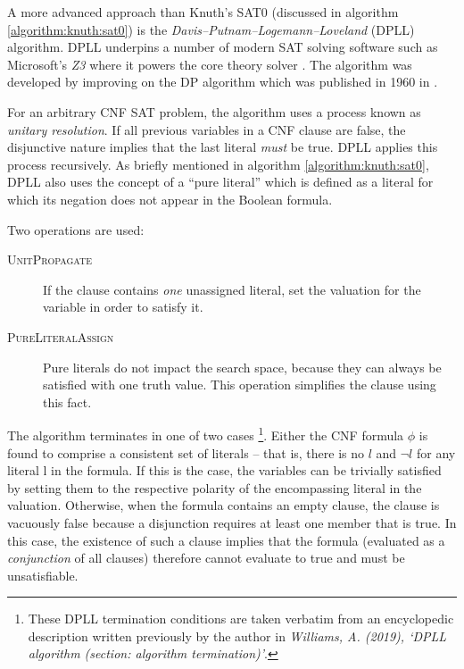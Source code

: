 \documentclass[a4paper,openany,12pt]{book}
\begin{document}
A more advanced approach than Knuth's SAT0 (discussed in algorithm \ref{algorithm:knuth:sat0}) is the \emph{Davis–Putnam–Logemann–Loveland} (DPLL) algorithm. DPLL underpins a number of modern SAT solving software such as Microsoft's \emph{Z3} where it powers the core theory solver \citep{de2008z3}. The algorithm was developed by improving on the DP algorithm which was published in 1960 in \citet{Davis:1960:CPQ:321033.321034}.

For an arbitrary CNF SAT problem, the algorithm uses a process known as \emph{unitary resolution}. If all previous variables in a CNF clause are false, the disjunctive nature implies that the last literal \emph{must} be true. DPLL applies this process recursively. As briefly mentioned in algorithm \ref{algorithm:knuth:sat0}, DPLL also uses the concept of a ``pure literal'' which is defined as a literal for which its negation does not appear in the Boolean formula.

Two operations are used:

\begin{description}
	\item[\textsc{UnitPropagate}] If the clause contains \emph{one} unassigned literal, set the valuation for the variable in order to satisfy it.
	\item[\textsc{PureLiteralAssign}] Pure literals do not impact the search space, because they can always be satisfied with one truth value. This operation simplifies the clause using this fact.
\end{description}

The algorithm terminates in one of two cases \footnote{These DPLL termination conditions are taken verbatim from an encyclopedic description written previously by the author in \emph{Williams, A. (2019), `DPLL algorithm (section: algorithm termination)'}.}. Either the CNF formula $\phi$ is found to comprise a consistent set of literals -- that is, there is no $l$ and $\neg l$ for any literal l in the formula. If this is the case, the variables can be trivially satisfied by setting them to the respective polarity of the encompassing literal in the valuation. Otherwise, when the formula contains an empty clause, the clause is vacuously false because a disjunction requires at least one member that is true. In this case, the existence of such a clause implies that the formula (evaluated as a \emph{conjunction} of all clauses) therefore cannot evaluate to true and must be unsatisfiable.
\end{document}
